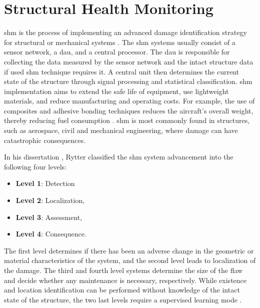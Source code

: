 \section{Structural Health Monitoring}
\label{sec:scm}

\Ac{shm} is the process of implementing an advanced damage identification strategy for structural or mechanical systems \cite{farrar2007introduction}.
The \ac{shm} systems usually consist of a sensor network, a \ac{dau}, and a central processor.
The \ac{dau} is responsible for collecting the data measured by the sensor network and the intact structure data if used \ac{shm} technique requires it.
A central unit then determines the current state of the structure through signal processing and statistical classification.
\ac{shm} implementation aims to extend the safe life of equipment, use lightweight materials, and reduce manufacturing and operating costs.
For example, the use of composites and adhesive bonding techniques reduces the aircraft's overall weight, thereby reducing fuel consumption \cite{scelsi2011potential}.
\ac{shm} is most commonly found in structures, such as aerospace, civil and mechanical engineering, where damage can have catastrophic consequences.

In his dissertation \cite{rytter1993vibrational}, Rytter classified the \ac{shm} system advancement into the following four levels:
\begin{itemize}
	\item[] \textbf{Level 1}: Detection
	\item[] \textbf{Level 2}: Localization,
	\item[] \textbf{Level 3}: Assessment,
	\item[] \textbf{Level 4}: Consequence.
\end{itemize}
The first level determines if there has been an adverse change in the geometric or material characteristics of the system, and the second level leads to localization of the damage.
The third and fourth level systems determine the size of the flaw and decide whether any maintenance is necessary, respectively.
While existence and location identification can be performed without knowledge of the intact state of the structure, the two last levels require a supervised learning mode \cite{worden2007fundamental}.
